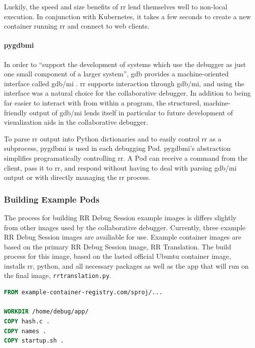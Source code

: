 \documentclass[12pt]{article}
\begin{document}
Luckily, the speed and size benefits of rr lend themselves well to
non-local execution.  In conjunction with Kubernetes, it takes a few
seconds to create a new container running rr and connect to web
clients.

\paragraph{pygdbmi}

In order to ``support the development of systems which use the
debugger as just one small component of a larger system'', gdb
provides a machine-oriented interface called gdb/mi \cite{gdbman}. rr
supports interaction through gdb/mi, and using the interface was a
natural choice for the collaborative debugger.  In addition to being
far easier to interact with from within a program, the structured,
machine-friendly output of gdb/mi lends itself in particular to future
development of visualization aids in the collaborative debugger.
\par
To parse rr output into Python dictionaries and to easily control rr
as a subprocess, pygdbmi \cite{pygdbmi} is used in each debugging Pod.
pygdbmi's abstraction simplifies programatically controlling rr.  A
Pod can receive a command from the client, pass it to rr, and respond
without having to deal with parsing gdb/mi output or with directly
managing the rr process.

\subsubsection{Building Example Pods} \label{buildingchannel}

The process for building RR Debug Session example images is differs
slightly from other images used by the collaborative debugger.
Currently, three example RR Debug Session images are availiable for
use.  Example container images are based on the primary RR Debug
Session image, RR Translation.  The build process for this image,
based on the lasted official Ubuntu container image, installs rr,
python, and all necessary packages as well as the app that will run on
the final image, \lstinline{rrtranslation.py}.

\begin{lstlisting}[language=Dockerfile,basicstyle=\linespread{0.5}\ttfamily,caption={RR Debug Session Hash Example---Dockerfile},captionpos=b]
FROM example-container-registry.com/sproj/...
  
WORKDIR /home/debug/app/
COPY hash.c .
COPY names .
COPY startup.sh .
\end{lstlisting}
\end{document}
